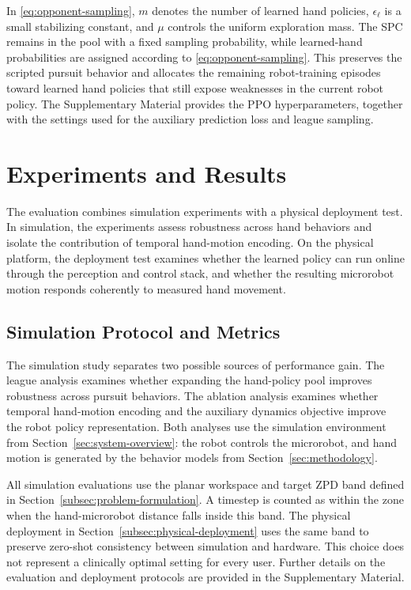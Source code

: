 \documentclass[lettersize,journal]{IEEEtran}
\begin{document}
In \eqref{eq:opponent-sampling}, $m$ denotes the number of learned hand policies, $\epsilon_{\ell}$ is a small stabilizing constant, and $\mu$ controls the uniform exploration mass. The SPC remains in the pool with a fixed sampling probability, while learned-hand probabilities are assigned according to \eqref{eq:opponent-sampling}. This preserves the scripted pursuit behavior and allocates the remaining robot-training episodes toward learned hand policies that still expose weaknesses in the current robot policy. The Supplementary Material provides the PPO hyperparameters, together with the settings used for the auxiliary prediction loss and league sampling.

\section{Experiments and Results}
\label{sec:experiments-results}
The evaluation combines simulation experiments with a physical deployment test. In simulation, the experiments assess robustness across hand behaviors and isolate the contribution of temporal hand-motion encoding. On the physical platform, the deployment test examines whether the learned policy can run online through the perception and control stack, and whether the resulting microrobot motion responds coherently to measured hand movement.

\subsection{Simulation Protocol and Metrics}
\label{subsec:simulation-protocol}
The simulation study separates two possible sources of performance gain. The league analysis examines whether expanding the hand-policy pool improves robustness across pursuit behaviors. The ablation analysis examines whether temporal hand-motion encoding and the auxiliary dynamics objective improve the robot policy representation. Both analyses use the simulation environment from Section~\ref{sec:system-overview}: the robot controls the microrobot, and hand motion is generated by the behavior models from Section~\ref{sec:methodology}.

All simulation evaluations use the planar workspace and target ZPD band defined in Section~\ref{subsec:problem-formulation}. A timestep is counted as within the zone when the hand-microrobot distance falls inside this band. The physical deployment in Section~\ref{subsec:physical-deployment} uses the same band to preserve zero-shot consistency between simulation and hardware. This choice does not represent a clinically optimal setting for every user. Further details on the evaluation and deployment protocols are provided in the Supplementary Material.
\end{document}
